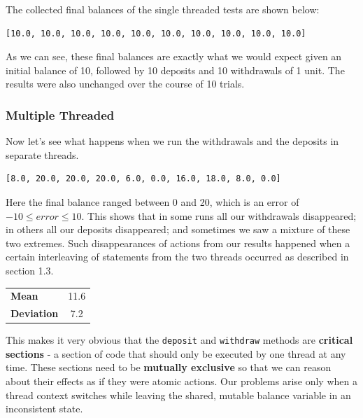 \documentclass[a4paper,12pt]{kth-mag}
\begin{document}
The collected final balances of the single threaded tests are shown below:

\begin{listing}[H]
	\begin{verbatim}
[10.0, 10.0, 10.0, 10.0, 10.0, 10.0, 10.0, 10.0, 10.0, 10.0]
	\end{verbatim}
\end{listing}

As we can see, these final balances are exactly what we would expect given an initial balance of 10, followed by 10 deposits and 10 withdrawals of 1 unit. The results were also unchanged over the course of 10 trials.

\subsubsection{Multiple Threaded}

Now let's see what happens when we run the withdrawals and the deposits in separate threads. 

\begin{listing}[H]
	\begin{verbatim}
[8.0, 20.0, 20.0, 20.0, 6.0, 0.0, 16.0, 18.0, 8.0, 0.0]
	\end{verbatim}
\end{listing}

Here the final balance ranged between 0 and 20, which is an error of $-10 \leq error \leq 10$. This shows that in some runs all our withdrawals disappeared; in others all our deposits disappeared; and sometimes we saw a mixture of these two extremes. Such disappearances of actions from our results happened when a certain interleaving of statements from the two threads occurred as described in section 1.3.

\begin{table}[h]
    \centering
    \begin{tabular}{lc}    
    \textbf{Mean} & 11.6 \\
    \textbf{Deviation} & 7.2 \\ 
    \end{tabular}
\end{table}

This makes it very obvious that the \texttt{deposit} and \texttt{withdraw} methods are \textbf{critical sections} - a section of code that should only be executed by one thread at any time. These sections need to be \textbf{mutually exclusive} so that we can reason about their effects as if they were atomic actions. Our problems arise only when a thread context switches while leaving the shared, mutable balance variable in an inconsistent state. 
\end{document}
